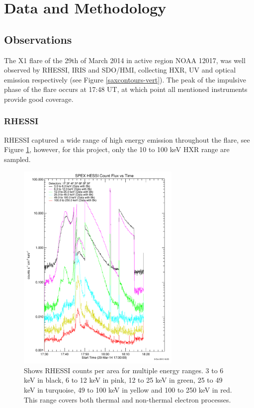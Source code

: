 \section{Data and Methodology}
\subsection{Observations}
The X1 flare of the 29th of March 2014 in active region NOAA 12017, was well observed by RHESSI, IRIS and SDO/HMI, collecting HXR, UV and optical emission respectively (see Figure \ref{saxcontours-vert}). The peak of the impulsive phase of the flare occurs at 17:48 UT, at which point all mentioned instruments provide good coverage. 

\subsubsection{RHESSI}
RHESSI captured a wide range of high energy emission throughout the flare, see Figure \ref{rhessicft}, however, for this project, only the 10 to 100 keV HXR range are sampled.

\begin{figure}[H]
  \begin{center}
  \includegraphics[width=0.7\textwidth]{count-flux-v-time-crop}
  \end{center}
  \caption{Shows RHESSI counts per area for multiple energy ranges. 3 to 6 keV in black, 6 to 12 keV in pink, 12 to 25 keV in green, 25 to 49 keV in turquoise, 49 to 100 keV in yellow and 100 to 250 keV in red. This range covers both thermal and non-thermal electron processes.}\label{rhessicft}
\end{figure}

